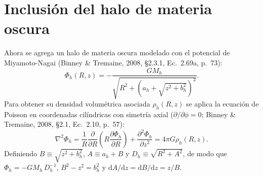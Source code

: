 \documentclass[11pt,letterpaper]{article}
\begin{document}
\section{Inclusión del halo de materia oscura}

Ahora se agrega un halo de materia oscura modelado con el potencial de Miyamoto-Nagai (Binney \& Tremaine, 2008, \S 2.3.1, Ec.~2.69a, p.~73):
\begin{equation}
    \Phi_h(R, z) = -\frac{G M_h}{\sqrt{R^2 + \left(a_h + \sqrt{z^2 + b_h^2}\right)^2}}.
    \label{eq:phi_mn}
\end{equation}
Para obtener su densidad volumétrica asociada $\rho_h(R, z)$ se aplica la ecuación de Poisson en coordenadas cilíndricas con simetría axial ($\partial/\partial\phi = 0$; Binney \& Tremaine, 2008, \S 2.1, Ec.~2.10, p.~57):
\begin{equation}
    \nabla^2\Phi_h = \frac{1}{R}\frac{\partial}{\partial R}\!\left(R\frac{\partial \Phi_h}{\partial R}\right) + \frac{\partial^2 \Phi_h}{\partial z^2} = 4\pi G \rho_h(R, z).
\end{equation}
Definiendo $B \equiv \sqrt{z^2 + b_h^2}$, $A \equiv a_h + B$ y $D_h \equiv \sqrt{R^2 + A^2}$, de modo que $\Phi_h = -G M_h\,D_h^{-1}$, $B^2 - z^2 = b_h^2$ y $\mathrm{d}A/\mathrm{d}z = \mathrm{d}B/\mathrm{d}z = z/B$.
\end{document}
